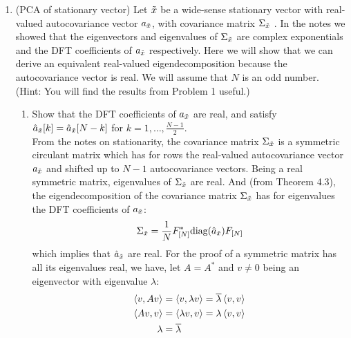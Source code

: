 \documentclass[12pt,twoside]{article}
\begin{document}
\begin{enumerate}
 \newpage
 \item (PCA of stationary vector) Let $\tilde{  x }$ be a wide-sense stationary vector with real-valued autocovariance vector $a_{\tilde{  x }}$,  with covariance matrix $\Sigma_{\tilde{  x }}$ . In the notes we showed that the eigenvectors and eigenvalues of $\Sigma_{\tilde{  x }}$ are complex exponentials and the DFT coefficients of $a_{\tilde{  x }}$ respectively. Here we will show that we can derive an equivalent real-valued eigendecomposition because the autocovariance vector is real. We will assume that $N$ is an odd number. (Hint: You will find the results from Problem 1 useful.)
 \begin{enumerate}
 \item Show that the DFT coefficients of $a_{\tilde{  x }}$ are real, and satisfy $\hat{a}_{\tilde{  x }}[k] = \hat{a}_{\tilde{  x }}[N-k]$ for $k=1,\ldots,\frac{N-1}{2}$.\\
 From the notes on stationarity, the covariance matrix $\Sigma_{\tilde{  x }}$ is a symmetric circulant matrix which has for rows the real-valued autocovariance vector $a_{\tilde{  x }}$ and shifted up to $N-1$ autocovariance vectors.
 Being a real symmetric matrix, eigenvalues of $\Sigma_{\tilde{  x }}$  are real. And (from Theorem 4.3), the eigendecomposition of the  covariance matrix $\Sigma_{\tilde{  x }}$ has for eigenvalues the DFT coefficients  of $a_{\tilde{  x }}$:
 $$\Sigma_{\tilde{  x }} = \frac{1}{N} F_{[N]}^* \text{diag}(\hat{a}_{\tilde{  x }}) F_{[N]}$$ which implies that  $\hat{a}_{\tilde{  x }}$ are real.
 For the proof of a symmetric matrix has all its eigenvalues real, we have, let $A=A^*$ and $v\neq 0$ being an eigenvector with eigenvalue $\lambda$:
 \begin{align*}
 	\left \langle v, Av\right \rangle	&= \left \langle v, \lambda v\right \rangle  = \overline{\lambda} \left \langle v, v\right \rangle  \\
 	\left \langle Av, v\right \rangle	&= \left \langle \lambda v, v\right \rangle  = \lambda \left \langle v, v\right \rangle  \\
	\lambda		&=  \overline{\lambda}
 \end{align*}
 

\end{enumerate}
\end{enumerate}
\end{document}
